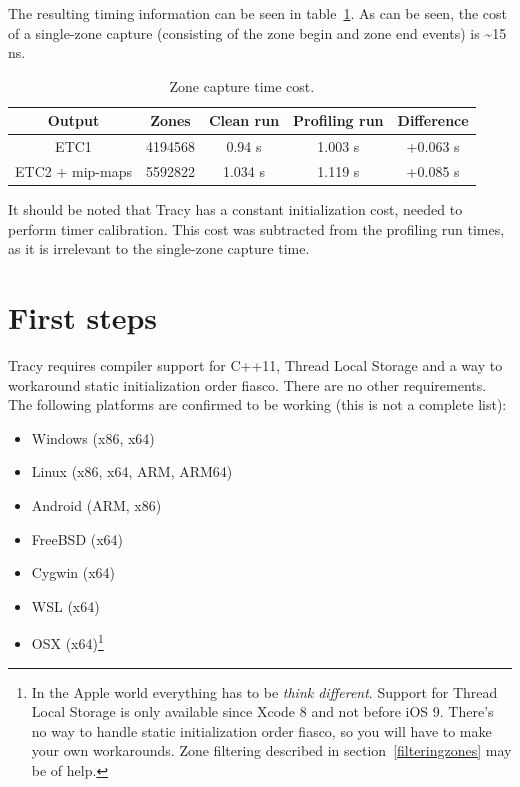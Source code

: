 \documentclass[hidelinks,titlepage,a4paper]{article}
\begin{document}
The resulting timing information can be seen in table~\ref{PerformanceImpact}. As can be seen, the cost of a single-zone capture (consisting of the zone begin and zone end events) is \textasciitilde 15 \si{\nano\second}.

\begin{table}[h]
\centering
\begin{tabular}[h]{c|c|c|c|c}
\textbf{Output} & \textbf{Zones} & \textbf{Clean run} & \textbf{Profiling run} & \textbf{Difference} \\ \hline
ETC1 & \num{4194568} & 0.94 \si{\second} & 1.003 \si{\second} & +0.063 \si{\second} \\
ETC2 + mip-maps & \num{5592822} & 1.034 \si{\second} & 1.119 \si{\second} & +0.085 \si{\second}
\end{tabular}
\caption{Zone capture time cost.}
\label{PerformanceImpact}
\end{table}

It should be noted that Tracy has a constant initialization cost, needed to perform timer calibration. This cost was subtracted from the profiling run times, as it is irrelevant to the single-zone capture time.

\section{First steps}

Tracy requires compiler support for C++11, Thread Local Storage and a way to workaround static initialization order fiasco. There are no other requirements. The following platforms are confirmed to be working (this is not a complete list):

\begin{itemize}
\item Windows (x86, x64)
\item Linux (x86, x64, ARM, ARM64)
\item Android (ARM, x86)
\item FreeBSD (x64)
\item Cygwin (x64)
\item WSL (x64)
\item OSX (x64)\footnote{In the Apple world everything has to be \emph{think different}. Support for Thread Local Storage is only available since Xcode 8 and not before iOS 9. There's no way to handle static initialization order fiasco, so you will have to make your own workarounds. Zone filtering described in section~\ref{filteringzones} may be of help.}
\end{itemize}
\end{document}
